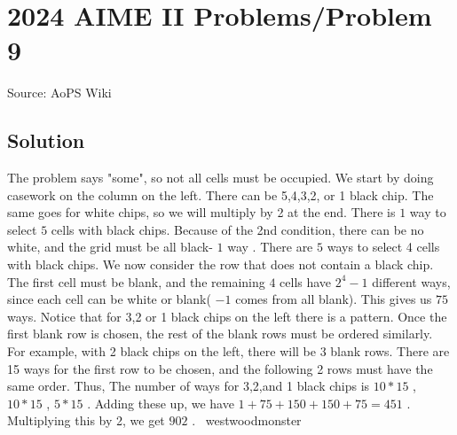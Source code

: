\documentclass[12pt]{article}
\begin{document}
\section*{{2024 AIME II Problems/Problem 9}}
Source: AoPS Wiki

\subsection*{Solution}
The problem says "some", so not all cells must be occupied.
We start by doing casework on the column on the left. There can be 5,4,3,2, or 1 black chip. The same goes for white chips, so we will multiply by 2 at the end. There is $1$ way to select $5$ cells with black chips. Because of the 2nd condition, there can be no white, and the grid must be all black- $1$ way . There are $5$ ways to select 4 cells with black chips. We now consider the row that does not contain a black chip. The first cell must be blank, and the remaining $4$ cells have $2^4-1$ different ways, since each cell can be white or blank( $-1$ comes from all blank). This gives us $75$ ways. Notice that for 3,2 or 1 black chips on the left there is a pattern. Once the first blank row is chosen, the rest of the blank rows must be ordered similarly. For example, with 2 black chips on the left, there will be 3 blank rows. There are 15 ways for the first row to be chosen, and the following 2 rows must have the same order. Thus, The number of ways for 3,2,and 1 black chips is $10*15$ , $10*15$ , $5*15$ . Adding these up, we have $1+75+150+150+75 = 451$ . Multiplying this by 2, we get $\boxed{902}$ .
~westwoodmonster
\end{document}
